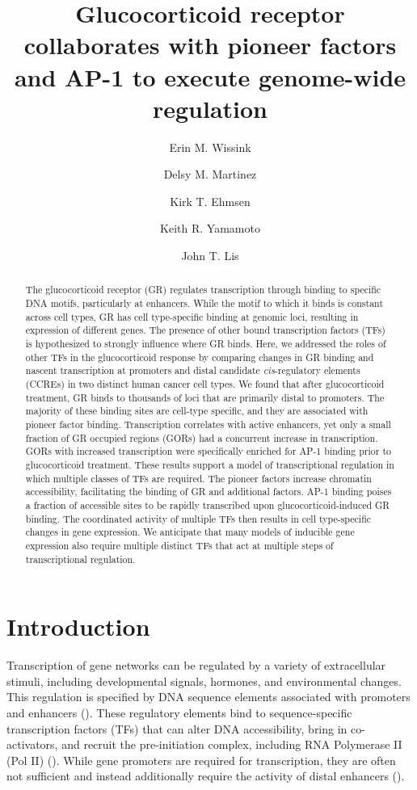 \documentclass{article}
\title{Glucocorticoid receptor collaborates with pioneer factors and AP-1 to execute genome-wide regulation}
\author[1]{Erin M. Wissink}
\author[2]{Delsy M. Martinez}
\author[2]{Kirk T. Ehmsen}
\author[2]{Keith R. Yamamoto}
\author[1, 3]{John T. Lis}
\affil[1]{Department of Molecular Biology and Genetics, Cornell University, Ithaca, NY}
\affil[2]{Department of Cellular and Molecular Pharmacology, University of California San Francisco School of Medicine, San Francisco, CA}
\affil[3]{Corresponding author, email: jtl10@cornell.edu}
\begin{document}
{\selectfont
\maketitle

\begin{abstract}
The glucocorticoid receptor (GR) regulates transcription through binding to specific DNA motifs, particularly at enhancers. While the motif to which it binds is constant across cell types, GR has cell type-specific binding at genomic loci, resulting in expression of different genes. The presence of other bound transcription factors (TFs) is hypothesized to strongly influence where GR binds. Here, we addressed the roles of other TFs in the glucocorticoid response by comparing changes in GR binding and nascent transcription at promoters and distal candidate \emph{cis}-regulatory elements (CCREs) in two distinct human cancer cell types. We found that after glucocorticoid treatment, GR binds to thousands of loci that are primarily distal to promoters. The majority of these binding sites are cell-type specific, and they are associated with pioneer factor binding. Transcription correlates with active enhancers, yet only a small fraction of GR occupied regions (GORs) had a concurrent increase in transcription. GORs with increased transcription were specifically enriched for AP-1 binding prior to glucocorticoid treatment. These results support a model of transcriptional regulation in which multiple classes of TFs are required. The pioneer factors increase chromatin accessibility, facilitating the binding of GR and additional factors. AP-1 binding poises a fraction of accessible sites to be rapidly transcribed upon glucocorticoid-induced GR binding. The coordinated activity of multiple TFs then results in cell type-specific changes in gene expression. We anticipate that many models of inducible gene expression also require multiple distinct TFs that act at multiple steps of transcriptional regulation.
\end{abstract}


\section*{Introduction}
Transcription of gene networks can be regulated by a variety of extracellular stimuli, including developmental signals, hormones, and environmental changes. This regulation is specified by DNA sequence elements associated with promoters and enhancers (\cite{zabidi_regulatory_2016, long_ever-changing_2016}). These regulatory elements bind to sequence-specific transcription factors (TFs) that can alter DNA accessibility, bring in co-activators, and recruit the pre-initiation complex, including RNA Polymerase II (Pol II) (\cite{core_promoter-proximal_2019}). While gene promoters are required for transcription, they are often not sufficient and instead additionally require the activity of distal enhancers (\cite{zabidi_regulatory_2016}).

}
\end{document}
